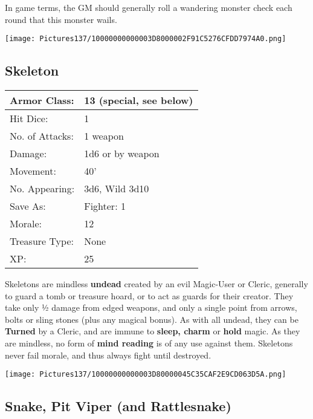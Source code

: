 \documentclass[a4paper,twoside,openany,10pt]{book}
\begin{document}
\begin{multicols}{2}
In game terms, the GM should generally roll a wandering monster check each
round that this monster wails.

\begin{center} \texttt{[image: Pictures137/10000000000003D8000002F91C5276CFDD7974A0.png]} \end{center}


\subsection*{Skeleton}\label{skeleton}

\begin{tabularx}{0.50\textwidth}{@{}lX@{}}
Armor Class: & 13 (special, see below) \\\hline
Hit Dice: & 1 \\\hline
No. of Attacks: & 1 weapon \\\hline
Damage: & 1d6 or by weapon \\\hline
Movement: & 40' \\\hline
No. Appearing: & 3d6, Wild 3d10 \\\hline
Save As: & Fighter: 1 \\\hline
Morale: & 12 \\\hline
Treasure Type: & None \\\hline
XP: & 25 \\\hline
\end{tabularx}\medskip

Skeletons
are mindless \textbf{undead} created by an evil Magic-User or Cleric, generally to guard a tomb or treasure hoard, or to act as guards for their creator. They take only ½ damage from edged weapons, and only a single point from arrows, bolts or sling stones (plus any magical bonus). As with all undead, they can be \textbf{Turned} by a Cleric, and are immune to \textbf{sleep, charm} or \textbf{hold} magic. As they are mindless, no form of \textbf{mind reading} is of any use against them. Skeletons never fail morale, and thus always fight until destroyed.

\begin{center} \texttt{[image: Pictures137/10000000000003D80000045C35CAF2E9CD063D5A.png]} \end{center}


\subsection*{Snake, Pit Viper (and Rattlesnake)}\label{snake-pit-viper-and-rattlesnake}


\end{multicols}
\end{document}
